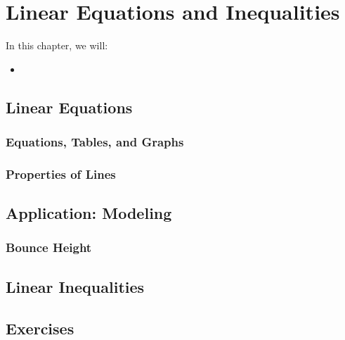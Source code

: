 
\chapter{Linear Equations and Inequalities}

\begin{summary}
In this chapter, we will: 
\begin{itemize}
    \item 
\end{itemize}
\end{summary}

\newpage 

\section{Linear Equations}

\subsection{Equations, Tables, and Graphs}
\subsection{Properties of Lines}


\newpage 
\section{Application: Modeling}
    \subsection{Bounce Height}

\newpage 
\section{Linear Inequalities}


\newpage 
\section{Exercises} 